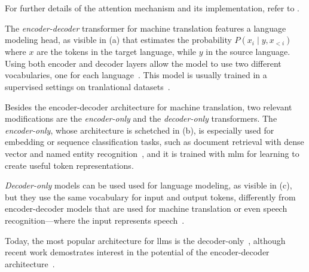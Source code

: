 For further details of the attention mechanism and its implementation, refer to \textcite{jm3}.

The \emph{encoder-decoder} transformer for machine translation features a language modeling head, as visible in (a) that estimates the probability $P(x_i \mid y,x_{<i})$ where $x$ are the tokens in the target language, while $y$ in the source language. Using both encoder and decoder layers allow the model to use two different vocabularies, one for each language~\cite{jm3}. This model is usually trained in a supervised settings on tranlational datasets~\cite{}.

Besides the encoder-decoder architecture for machine translation, two relevant modifications are the \emph{encoder-only} and the \emph{decoder-only} transformers. The \emph{encoder-only}, whose architecture is schetched in (b), is especially used for embedding or sequence classification tasks, such as document retrieval with dense vector and named entity recognition~\cite{jm3,devlin-etal-2019-bert}, and it is trained with \ac{mlm} for learning to create useful token representations.

\emph{Decoder-only} models can be used used for language modeling, as visible in (c), but they use the same vocabulary for input and output tokens, differently from encoder-decoder models that are used for machine translation or even speech recognition---where the input represents speech~\cite{jm3}.

Today, the most popular architecture for \acp{llm} is the decoder-only~\cite{zhang2025encoderdecodergemmaimprovingqualityefficiency,qorib-etal-2024-decoder}, although recent work demostrates interest in the potential of the encoder-decoder architecture~\cite{zhang2025encoderdecodergemmaimprovingqualityefficiency}.

